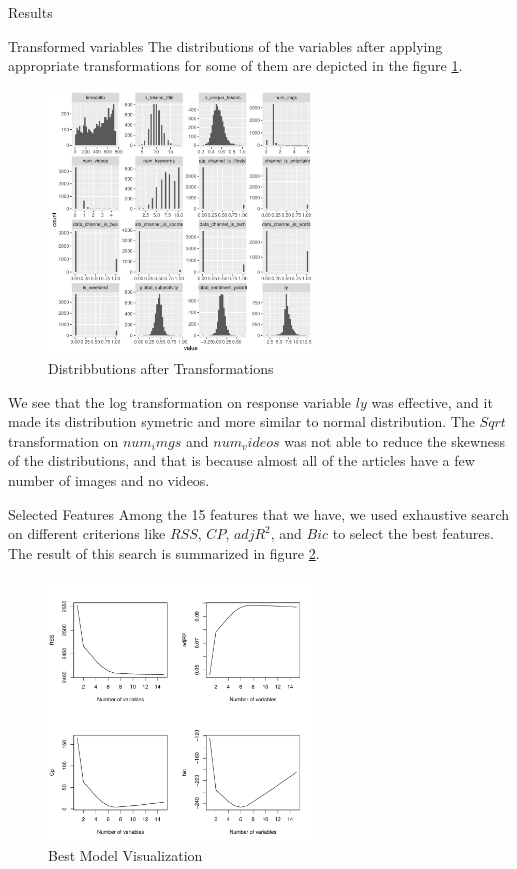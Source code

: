 \documentclass[a4paper,11pt]{article}
\begin{document}
\begin{section}{Results}
\begin{subsection}{Transformed variables}
The distributions of the variables after applying appropriate transformations for some of them are depicted in the figure \ref{dist-trans}.

\begin{figure}[h]
\includegraphics [width=7cm,height=7cm]{transformed-dists}
\centering
\caption{Distribbutions after Transformations}
\label{dist-trans}
\end{figure}

We see that the log transformation on response variable $ly$ was effective, and it made its distribution symetric and more similar to normal distribution. The $Sqrt$ transformation on $num_imgs$ and $num_videos$ was not able to reduce the skewness of the distributions, and that is because almost all of the articles have a few number of images and no videos.
\end{subsection}

\begin{subsection}{Selected Features}
Among the 15 features that we have, we used exhaustive search on different criterions like $RSS$, $CP$, $adjR^2$, and $Bic$ to select the best features. The result of this search is summarized in figure \ref{best-vis}.

\begin{figure}[h]
\includegraphics [width=7cm,height=7cm]{best-vis}
\centering
\caption{Best Model Visualization}
\label{best-vis}
\end{figure}


\end{subsection}
\end{section}
\end{document}

